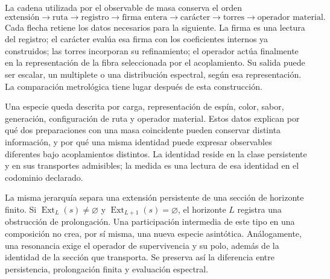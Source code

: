 La cadena utilizada por el observable de masa conserva el orden
\begin{equation}
 \text{extensión}\longrightarrow\text{ruta}\longrightarrow
 \text{registro}\longrightarrow\text{firma entera}\longrightarrow
 \text{carácter}\longrightarrow\text{torres}\longrightarrow
 \text{operador material}.
 \label{vi:eq:cadena-material}
\end{equation}
Cada flecha retiene los datos necesarios para la siguiente. La firma es
una lectura del registro; el carácter evalúa esa firma con los
coeficientes internos ya construidos; las torres incorporan su
refinamiento; el operador actúa finalmente en la representación de la
fibra seleccionada por el acoplamiento. Su salida puede ser escalar,
un multiplete o una distribución espectral, según esa representación.
La comparación metrológica tiene lugar después de esta construcción.

Una especie queda descrita por carga, representación de espín, color,
sabor, generación, configuración de ruta y operador material. Estos datos
explican por qué dos preparaciones con una masa coincidente pueden
conservar distinta información, y por qué una misma identidad puede
expresar observables diferentes bajo acoplamientos distintos. La
identidad reside en la clase persistente y en sus transportes admisibles;
la medida es una lectura de esa identidad en el codominio declarado.

La misma jerarquía separa una extensión persistente de una sección de
horizonte finito. Si $\operatorname{Ext}_L(s)\ne\varnothing$ y
$\operatorname{Ext}_{L+1}(s)=\varnothing$, el horizonte $L$ registra
una obstrucción de prolongación. Una participación intermedia de este
tipo en una composición no crea, por sí misma, una nueva especie
asintótica. Análogamente, una resonancia exige el operador de
supervivencia y su polo, además de la identidad de la sección que
transporta. Se preserva así la diferencia entre persistencia,
prolongación finita y evaluación espectral.
